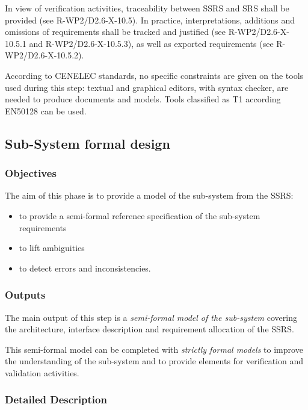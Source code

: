 In view of verification activities, traceability between SSRS and SRS shall be provided (see R-WP2/D2.6-X-10.5). In practice, interpretations, additions and omissions of requirements shall be tracked and justified (see R-WP2/D2.6-X-10.5.1 and R-WP2/D2.6-X-10.5.3), as well as exported requirements  (see R-WP2/D2.6-X-10.5.2).

According to  CENELEC standards, no specific constraints are given on the tools used during this step: textual and graphical editors, with syntax checker, are needed to  produce documents and models. Tools classified as T1 according EN50128 can be used.


\subsection{Sub-System formal design}
\label{sec:subsyst-formal-design}



\subsubsection{Objectives}
\label{sec:sys-fm-objective}

The aim of this phase is to provide a model of the sub-system from the SSRS:

\begin{itemize}
\item to provide a semi-formal reference specification of the sub-system requirements
\item to lift ambiguities
\item to detect errors and inconsistencies.
\end{itemize}


\subsubsection{Outputs}
\label{sec:sys-fm-outputs}


The main output of this step is a \textit{semi-formal model of the sub-system}  covering the architecture, interface description and requirement allocation of the SSRS.

This semi-formal model can be completed with \textit{strictly formal models} to improve the understanding of the sub-system and to provide elements for verification and validation activities.

\subsubsection{Detailed Description}
\label{sec:sys-dev-deta-descr}


